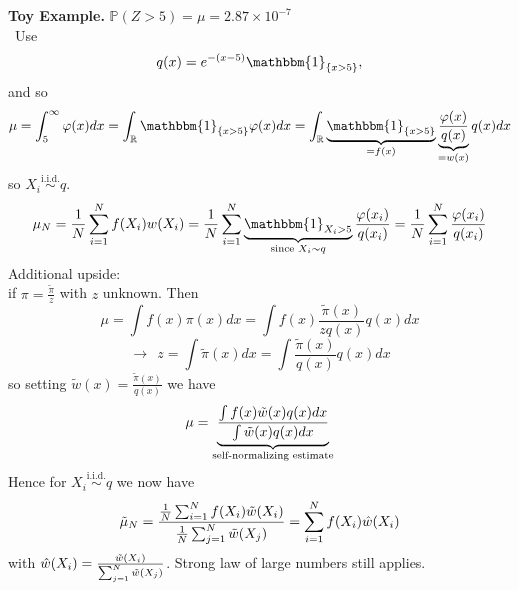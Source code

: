 \documentclass{article}
\begin{document}
\textbf{Toy Example.} $\mathbb{P}(Z>5) = \mu= 2.87 \times 10 ^{-7}$\\\
Use 
\begin{equation*}
    q(x)= e ^{-(x-5)} \mathbbm{1}_{\{x>5\}},
\end{equation*}
and so 
\begin{equation*}
    \mu = \int_5^{\infty} \varphi(x) dx= \int_{\mathbb{R}} \mathbbm{1}_{\{x>5\}} \varphi(x) dx = \int_{\mathbb{R}} \underbrace{\mathbbm{1}_{\{x>5\}}}_{= f(x)} \underbrace{\frac{\varphi(x)}{q(x)}}_{=w(x)} q(x) dx
\end{equation*}
so $X_i \stackrel{\text{i.i.d.}}{\sim} q $.
\begin{equation*}
    \mu_N= \frac{1}{N} \sum_{i=1}^N f(X_i)w(X_i) = \frac{1}{N} \sum_{i=1}^N \underbrace{\mathbbm{1}_{X_i>5} }_{\text{since } X_i \sim q }\frac{\varphi(x_i)}{q(x_i)}  = \frac{1}{N} \sum_{i=1}^N\frac{\varphi(x_i)}{q(x_i)} 
\end{equation*}
Additional upside:\\
if $\pi= \frac{\tilde{\pi}}{z}$ with $z$ unknown. Then
\begin{equation*}
    \mu = \int f(x) \pi (x) dx = \int f(x)\frac{\tilde{\pi}(x)}{z q(x)} q(x) dx 
\end{equation*}
\begin{equation*}
    \rightarrow \ \ z= \int \tilde{\pi}(x) dx = \int \frac{\tilde{\pi}(x)}{q(x)}q(x) dx 
\end{equation*}
so setting $\tilde{w}(x)=\frac{\tilde{\pi}(x)}{q(x)}$ we have 
\begin{equation*}
     \mu = \underbrace{\frac{\int f(x) \Tilde{w}(x) q(x) dx }{\int \Tilde{w}(x) q(x) dx}}_{\text{self-normalizing estimate}}
\end{equation*}
Hence for $X_i \stackrel{\text{i.i.d.}}{\sim} q $ we now have 
\begin{equation*}
    \Tilde{\mu}_N = \frac{\frac{1}{N} \sum_{i=1}^N f(X_i)\Tilde{w}(X_i)}{\frac{1}{N} \sum_{j=1}^N \Tilde{w}(X_j)} = \sum_{i=1}^N  f(X_i) \hat{w}(X_i)
\end{equation*}
with $\hat{w}(X_i)= \frac{\Tilde{w}(X_i)}{\sum_{j=1}^N \Tilde{w}(X_j)}$. Strong law of large numbers still applies. \\
\end{document}
